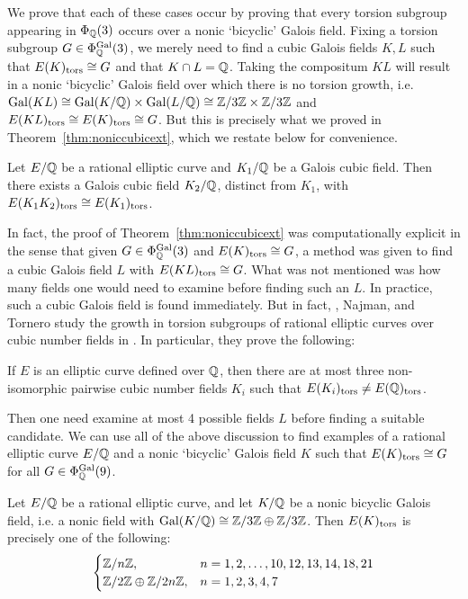 We prove that each of these cases occur by proving that every torsion subgroup appearing in $\Phi_{\mathbb{Q}}(3)$ occurs over a nonic `bicyclic' Galois field. Fixing a torsion subgroup $G \in \Phi_{\mathbb{Q}}^{\operatorname{Gal}}(3)$, we merely need to find a cubic Galois fields $K, L$ such that $E(K)_{\text{tors}} \cong G$ and that $K \cap L= \mathbb{Q}$. Taking the compositum $KL$ will result in a nonic `bicyclic' Galois field over which there is no torsion growth, i.e. $\operatorname{Gal}(KL) \cong \operatorname{Gal}(K/\mathbb{Q}) \times \operatorname{Gal}(L/\mathbb{Q}) \cong \mathbb{Z}/3\mathbb{Z} \times \mathbb{Z}/3\mathbb{Z}$ and $E(KL)_{\text{tors}} \cong E(K)_{\text{tors}} \cong G$. But this is precisely what we proved in Theorem~\ref{thm:noniccubicext}, which we restate below for convenience. 


\begin{thm}
Let $E/\mathbb{Q}$ be a rational elliptic curve and $K_1/\mathbb{Q}$ be a Galois cubic field. Then there exists a Galois cubic field $K_2/\mathbb{Q}$, distinct from $K_1$, with $E(K_1K_2)_{\text{tors}} \cong E(K_1)_{\text{tors}}$. 
\end{thm}


In fact, the proof of Theorem~\ref{thm:noniccubicext} was computationally explicit in the sense that given $G \in \Phi_{\mathbb{Q}}^{\operatorname{Gal}}(3)$ and $E(K)_{\text{tors}} \cong G$, a method was given to find a cubic Galois field $L$ with $E(KL)_{\text{tors}} \cong G$. What was not mentioned was how many fields one would need to examine before finding such an $L$. In practice, such a cubic Galois field is found immediately. But in fact, \gonjim{}, Najman, and Tornero study the growth in torsion subgroups of rational elliptic curves over cubic number fields in \cite{gonjimnajmantornero16}. In particular, they prove the following:


\begin{thm}
If $E$ is an elliptic curve defined over $\mathbb{Q}$, then there are at most three non-isomorphic pairwise cubic number fields $K_i$ such that $E(K_i)_{\text{tors}} \neq E(\mathbb{Q})_{\text{tors}}$. 
\end{thm}


Then one need examine at most 4 possible fields $L$ before finding a suitable candidate. We can use all of the above discussion to find examples of a rational elliptic curve $E/\mathbb{Q}$ and a nonic `bicyclic' Galois field $K$ such that $E(K)_{\text{tors}} \cong G$ for all $G \in \Phi_{\mathbb{Q}}^{\operatorname{Gal}}(9)$. 


\begin{thm}
Let $E/\mathbb{Q}$ be a rational elliptic curve, and let $K/\mathbb{Q}$ be a nonic bicyclic Galois field, i.e. a nonic field with $\operatorname{Gal}(K/\mathbb{Q}) \cong \mathbb{Z}/3\mathbb{Z} \oplus \mathbb{Z}/3\mathbb{Z}$. Then $E(K)_{\text{tors}}$ is precisely one of the following:
	\[
	\begin{cases}
	\mathbb{Z}/n\mathbb{Z}, & n= 1, 2, \ldots, 10, 12, 13, 14, 18, 21 \\
	\mathbb{Z}/2\mathbb{Z} \oplus \mathbb{Z}/2n\mathbb{Z}, & n= 1, 2, 3, 4, 7
	\end{cases}
	\]
\end{thm}

